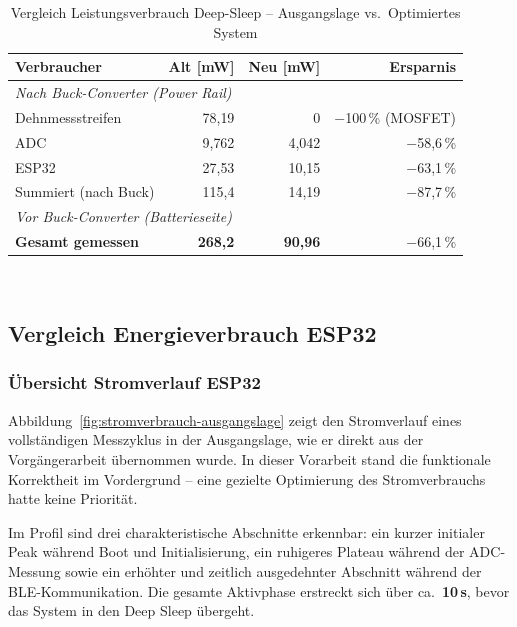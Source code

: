 \documentclass[12pt,a4paper]{article}
\begin{document}
	\begin{table}[H]
	\centering
	\caption{Vergleich Leistungsverbrauch Deep-Sleep -- Ausgangslage vs.\ Optimiertes System}
	\label{tab:sys-vergleich-deep-sleep}
	\begin{tabular}{@{}lrrr@{}}
		\toprule
		Verbraucher & Alt [mW] & Neu [mW] & Ersparnis \\
		\midrule
		\multicolumn{4}{l}{\textit{Nach Buck-Converter (Power Rail)}} \\[2pt]
		\quad Dehnmessstreifen       & 78{,}19  & 0        & $-$100\,\% (MOSFET) \\
		\quad ADC                    & 9{,}762  & 4{,}042  & $-$58{,}6\,\% \\
		\quad ESP32                  & 27{,}53  & 10{,}15  & $-$63{,}1\,\% \\
		\midrule
		Summiert (nach Buck)         & 115{,}4  & 14{,}19  & $-$87{,}7\,\% \\
		\midrule
		\multicolumn{4}{l}{\textit{Vor Buck-Converter (Batterieseite)}} \\[2pt]
		\textbf{Gesamt gemessen}     & \textbf{268{,}2} & \textbf{90{,}96} & $-$66{,}1\,\% \\
		\bottomrule
	\end{tabular}
	\\[4pt]
	\end{table}

	\subsection{Vergleich Energieverbrauch ESP32}
	
	\subsubsection{Übersicht Stromverlauf ESP32}
	
	Abbildung~\ref{fig:stromverbrauch-ausgangslage} zeigt den Stromverlauf eines vollständigen Messzyklus in der Ausgangslage, wie er direkt aus der Vorgängerarbeit übernommen wurde.
	In dieser Vorarbeit stand die funktionale Korrektheit im Vordergrund -- eine gezielte Optimierung des Stromverbrauchs hatte keine Priorität.
	
	Im Profil sind drei charakteristische Abschnitte erkennbar: ein kurzer initialer Peak während Boot und Initialisierung, ein ruhigeres Plateau während der ADC-Messung sowie ein erhöhter und zeitlich ausgedehnter Abschnitt während der BLE-Kommunikation.
	Die gesamte Aktivphase erstreckt sich über ca.\ \textbf{10\,s}, bevor das System in den Deep Sleep übergeht.
	
\end{document}
